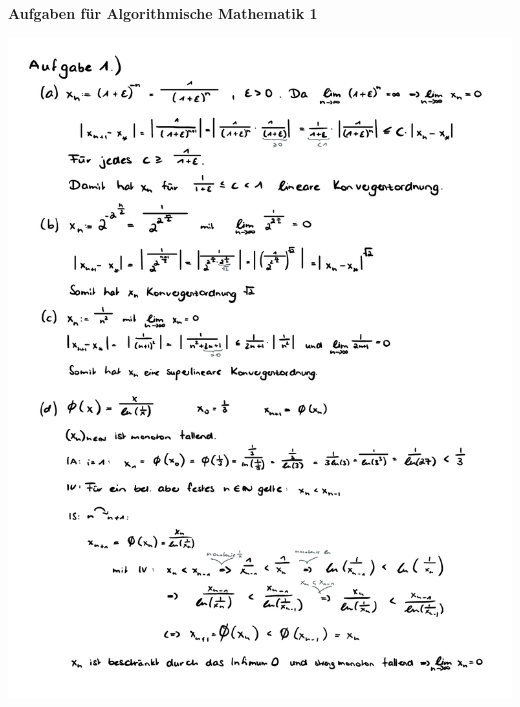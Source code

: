 \documentclass[a4paper,oneside,11pt]{scrartcl}
\begin{document}

\begin{center}
{\Large{\textbf{Aufgaben für Algorithmische Mathematik 1}}} \\
\end{center}
\begin{minipage}[t]{\textwidth}
\includegraphics[scale = 0.75, page=1]{AlMa1_Zettel05.pdf}
\end{minipage}
\pagebreak
\end{document}
